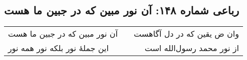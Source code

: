 \begin{center}
\section*{رباعی شماره ۱۴۸: آن نور مبین که در جبین ما هست}
\label{sec:0148}
\begin{longtable}{l p{0.5cm} r}
آن نور مبین که در جبین ما هست
&&
وان ض یقین که در دل آگاهست
\\
این جملهٔ نور بلکه نور همه نور
&&
از نور محمد رسول‌الله است
\\
\end{longtable}
\end{center}
